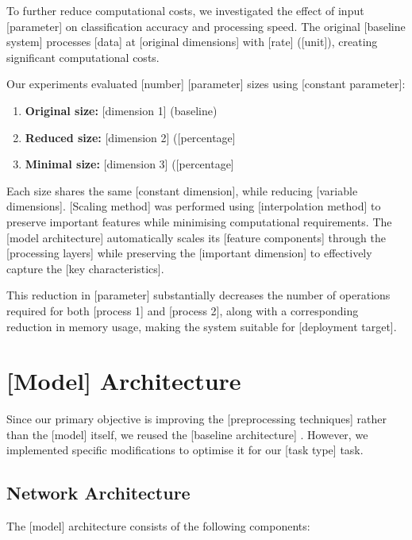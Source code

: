 To further reduce computational costs, we investigated the effect of input [parameter] on classification accuracy and processing speed. The original [baseline system] processes [data] at [original dimensions] with [rate] ([unit]), creating significant computational costs.

Our experiments evaluated [number] [parameter] sizes using [constant parameter]:
\begin{enumerate}
\item \textbf{Original size:} [dimension 1] (baseline)
\item \textbf{Reduced size:} [dimension 2] ([percentage]%
\item \textbf{Minimal size:} [dimension 3] ([percentage]%
\end{enumerate}

Each size shares the same [constant dimension], while reducing [variable dimensions]. [Scaling method] was performed using [interpolation method] to preserve important features while minimising computational requirements. The [model architecture] automatically scales its [feature components] through the [processing layers] while preserving the [important dimension] to effectively capture the [key characteristics].

This reduction in [parameter] substantially decreases the number of operations required for both [process 1] and [process 2], along with a corresponding reduction in memory usage, making the system suitable for [deployment target].

\section{[Model] Architecture}

Since our primary objective is improving the [preprocessing techniques] rather than the [model] itself, we reused the [baseline architecture] \cite{sample2022reference}. However, we implemented specific modifications to optimise it for our [task type] task.

\subsection{Network Architecture}

The [model] architecture consists of the following components:

